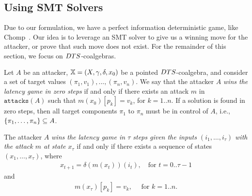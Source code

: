 \begin{example}
\end{example}


\subsection{Using SMT Solvers}
Due to our formulation, we have a perfect information deterministic game, like Chomp~\cite{Chomp}. Our idea is to leverage an SMT solver to give us a winning move for the attacker, or prove that such move does not exist. For the remainder of this section, we focus on $DTS$-coalgebras.

\begin{definition}
Let $A$ be an  attacker, ${\mathbb{X}}=(X,\gamma,\delta,x_0)$ be a pointed $DTS$-coalgebra, and consider a set of target values $(\pi_1,v_1),...,(\pi_n,v_n)$. We say that the attacker $A$ \emph{wins the latency game in zero steps} if and only if there exists an attack $m$ in $\texttt{attacks}(A)$ such that $m(x_0)[p_k]=v_k$, for $k=1..n$. If a solution is found in zero steps, then all target components $\pi_1$ to $\pi_n$ must be in control of $A$, i.e., $\left\{\pi_1, \ldots, \pi_n\right\}\subseteq A$.

The attacker $A$ \emph{wins the latency game in $\tau$ steps given the inputs $(i_1, \ldots, i_\tau)$ with the attack $m$ at state $x_{\tau}$} if and only if there exists a sequence of states $(x_1, \ldots, x_\tau)$, where
\begin{align}
x_{t+1}=\delta(m (x_{t}))(i_t), \quad \text{for $t=0..{\tau-1}$}
\end{align}
and
\begin{align}
m(x_\tau)[p_k]=v_k,\quad \text{ for $k=1..n$.}
\end{align}
\end{definition}


